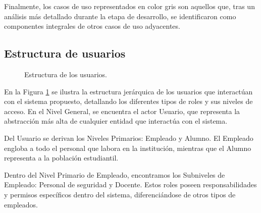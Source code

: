 Finalmente, los casos de uso representados en color gris son aquellos que, tras un análisis más detallado durante la etapa de desarrollo, se identificaron como componentes integrales de otros casos de uso adyacentes.


\subsection{Estructura de usuarios }

\begin{figure}[htbp!]
	\begin{center}
		\caption{Estructura de los usuarios.}
		\label{fig:EstructuraU}
	\end{center}
\end{figure} 

En la Figura \ref{fig:EstructuraU} se ilustra la estructura jerárquica de los usuarios que interactúan con el sistema propuesto, detallando los diferentes tipos de roles y sus niveles de acceso. En el Nivel General, se encuentra el actor Usuario, que representa la abstracción más alta de cualquier entidad que interactúa con el sistema.

Del Usuario se derivan los Niveles Primarios: Empleado y Alumno. El Empleado engloba a todo el personal que labora en la institución, mientras que el Alumno representa a la población estudiantil.

Dentro del Nivel Primario de Empleado, encontramos los Subniveles de Empleado: Personal de seguridad y Docente. Estos roles poseen responsabilidades y permisos específicos dentro del sistema, diferenciándose de otros tipos de empleados.

